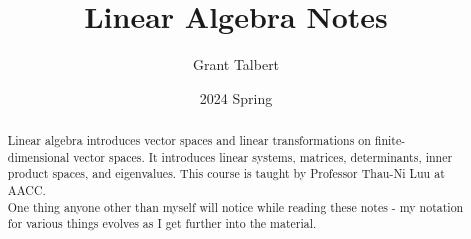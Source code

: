 \documentclass[12pt, letterpaper]{report}
\title{Linear Algebra Notes}
\author{Grant Talbert}
\date{2024 Spring}
\begin{document}
	\maketitle
	
	\begin{abstract}
		Linear algebra introduces vector spaces and linear transformations on finite-dimensional vector spaces. It introduces linear systems, matrices, determinants, inner product spaces, and eigenvalues. This course is taught by Professor Thau-Ni Luu at AACC.\\
		One thing anyone other than myself will notice while reading these notes - my notation for various things evolves as I get further into the material.
	\end{abstract}
	
	\newpage
	
	\tableofcontents
	
	\newpage

\end{document}
